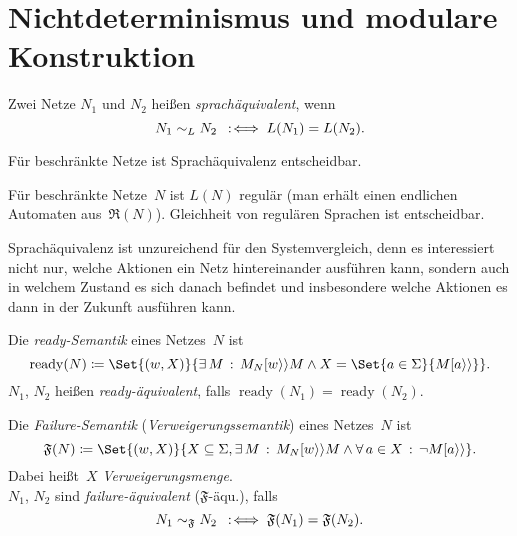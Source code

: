 \documentclass{cheat-sheet}
\newcommand{\labelledTransition}[1]{[{#1}\rangle\rangle} %
\newcommand{\ReachabilityGraph}{\mathfrak{R}} %
\DeclareMathOperator{\ready}{ready} %
\newcommand{\Failure}{\mathfrak{F}} %
\begin{document}
\section{Nichtdeterminismus und modulare Konstruktion}

\begin{defn}
  Zwei Netze $N_1$ und $N_2$ heißen \emph{sprachäquivalent}, wenn
  \[
    N_1 \sim_L N_2 \enspace:\!\iff L(N_1) = L(N_2).
  \]
\end{defn}

\begin{satz}
  Für beschränkte Netze ist Sprachäquivalenz entscheidbar.
\end{satz}

\begin{beweis}
  Für beschränkte Netze~$N$ ist $L(N)$ regulär (man erhält einen endlichen Automaten aus~$\ReachabilityGraph(N)$).
  Gleichheit von regulären Sprachen ist entscheidbar.
\end{beweis}

\begin{bem}
  Sprachäquivalenz ist unzureichend für den Systemvergleich, denn es interessiert nicht nur, welche Aktionen ein Netz hintereinander ausführen kann, sondern auch in welchem Zustand es sich danach befindet und insbesondere welche Aktionen es dann in der Zukunft ausführen kann.
\end{bem}

\begin{defn}
  Die \emph{ready-Semantik} eines Netzes~$N$ ist
  \[
    \ready(N) \coloneqq \Set{(w, X)}{\ex{M} M_N \labelledTransition{w} M \wedge X = \Set{a \in \Sigma}{M \labelledTransition{a}}}.
  \]
  $N_1$, $N_2$ heißen \emph{ready-äquivalent}, falls $\ready(N_1) = \ready(N_2)$.
\end{defn}

\begin{defn}
  Die \emph{Failure-Semantik} (\textit{Verweigerungssemantik}) eines Netzes~$N$ ist
  \[
    \Failure(N) \coloneqq \Set{(w, X)}{X \subseteq \Sigma, \ex{M} M_N \labelledTransition{w} M \wedge \fa{a \in X} \neg M \labelledTransition{a}}.
  \]
  Dabei heißt~$X$ \textit{Verweigerungsmenge}. \\
  $N_1$, $N_2$ sind \emph{failure-äquivalent} ($\Failure$-äqu.), falls
  \[
    N_1 \sim_\Failure N_2 \coloniff \Failure(N_1) = \Failure(N_2).
  \]
\end{defn}

\begin{nota}
\end{nota}
\end{document}
